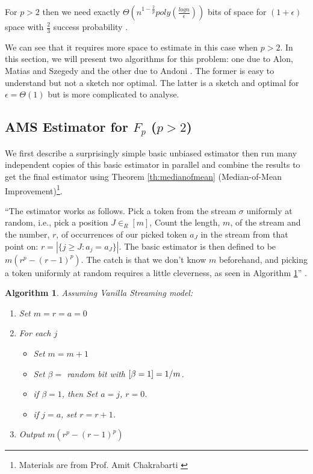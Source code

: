 \documentclass[11pt]{article}
\theoremstyle{plain}
\newtheorem{algorithm}{Algorithm}[section]
\let\Pr\relax
\DeclareMathOperator*{\Pr}{\mathbb{P}}
\begin{document}
For $p >2$ then we 
need exactly $\Theta(n^{1-\frac{2}{p}} 
poly(\frac{logn}{\epsilon}))$ bits of space for $(1+\epsilon)$ space with 
$\frac{2}{3}$ success probability \cite{Bar-Yossef04,IndykW05}.

We can see that it requires more space to estimate in this case when $p>2$. In 
this 
section, we will present two algorithms for this problem: one due to Alon, 
Matias and 
Szegedy \cite{AMS99} and the other due to Andoni 
\cite{Andoni13highfrequency}. 
The former is easy to understand but not a sketch nor optimal. The latter is a 
sketch 
and optimal for $\epsilon=\Theta(1)$ but is more complicated to analyse. 

\subsection{AMS Estimator for $F_p$ ($p>2$)}
We first describe a surprisingly simple basic unbiased estimator then run many 
independent copies of this basic estimator in parallel and combine the results
to get the final estimator using Theorem \ref{th:medianofmean} 
(Median-of-Mean 
Improvement)\footnote{Materials are from Prof. Amit Chakrabarti  
\cite{Cha2015-notes}}.

``The estimator works as follows. Pick a token from the stream $\sigma$ 
uniformly 
at random, i.e., pick a position $J\in_R [m]$, 
Count the length, $m$, of the stream and the number, $r$, of occurrences of our 
picked token $a_J$  in the stream from that
point on: $r=|\{j\geq J:a_j=a_J\}|$. The basic estimator is then defined to be 
$m(r^p-(r-1)^p)$. The catch is that we don’t know $m$ beforehand, and picking 
a token uniformly at 
random requires a little cleverness, as seen in Algorithm \ref{al:amsp>2}'' 
\cite{AMS99}.

\begin{algorithm}
\label{al:amsp>2}
Assuming Vanilla Streaming model:
\begin{enumerate}
	\item Set $m=r=a=0$
	\item For each $j$ \begin{itemize}
		\item Set $m=m+1$
		\item Set $\beta=$ random bit with $\Pr[\beta=1]=1/m$.
		\item if  $\beta=1$, then Set $a=j$, $r=0$.
		\item if $j=a$, set $r=r+1$.
	\end{itemize}
\item Output $m(r^p-(r-1)^p)$
\end{enumerate}
\end{algorithm}
\end{document}
